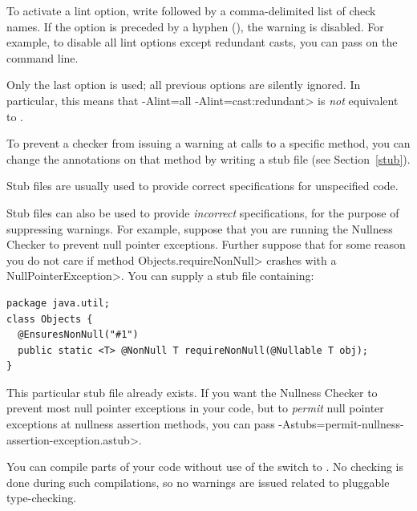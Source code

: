 
\noindent
To activate a lint option, write  followed by a
comma-delimited list of check names.  If the option is preceded by a
hyphen (\code{-}), the warning is disabled.  For example, to disable all
lint options except redundant casts, you can pass
 on the command line.

Only the last  option is used; all previous 
options are silently ignored.  In particular, this means that \<-Alint=all
-Alint=cast:redundant> is \emph{not} equivalent to
.



To prevent a checker from issuing a warning at calls to a specific method,
you can change the annotations on that method by writing a stub file (see
Section~\ref{stub}).

Stub files are usually used to provide correct specifications for
unspecified code.

Stub files can also be used to provide \emph{incorrect} specifications, for
the purpose of suppressing warnings.  For example, suppose that you are
running the Nullness Checker to prevent null pointer exceptions.  Further
suppose that for some reason you do not care if method
\<Objects.requireNonNull> crashes with a \<NullPointerException>.  You can
supply a stub file containing:

\begin{Verbatim}
package java.util;
class Objects {
  @EnsuresNonNull("#1")
  public static <T> @NonNull T requireNonNull(@Nullable T obj);
}
\end{Verbatim}

This particular stub file already exists.
If you want the Nullness Checker to prevent most null
pointer exceptions in your code, but to \emph{permit} null pointer
exceptions at nullness assertion methods, you can pass
\<-Astubs=permit-nullness-assertion-exception.astub>.



You can compile parts of your code without use of the
 switch to .  No checking is done during
such compilations, so no warnings are issued related to pluggable
type-checking.

